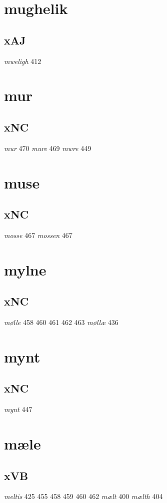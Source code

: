 \documentclass[a4paper,twocolumn]{article}
\begin{document}
\section{mughelik}
\label{sec:orgfcef184}
\subsection{xAJ}
\label{sec:org5dc625d}
\emph{mweligh} 412 
\section{mur}
\label{sec:org28454e4}
\subsection{xNC}
\label{sec:orgb9dc32b}
\emph{mur} 470 \emph{mure} 469 \emph{mwre} 449 
\section{muse}
\label{sec:orga59c92a}
\subsection{xNC}
\label{sec:orge5891dc}
\emph{mosse} 467 \emph{mossen} 467 
\section{mylne}
\label{sec:org7768313}
\subsection{xNC}
\label{sec:org20fe0a1}
\emph{mølle} 458 460 461 462 463 \emph{møllæ} 436 
\section{mynt}
\label{sec:orgeb9f0fd}
\subsection{xNC}
\label{sec:org829f68c}
\emph{mynt} 447 
\section{mæle}
\label{sec:org2e154bc}
\subsection{xVB}
\label{sec:org97f1263}
\emph{meltis} 425 455 458 459 460 462 \emph{mælt} 400 \emph{mælth} 404 
\end{document}
